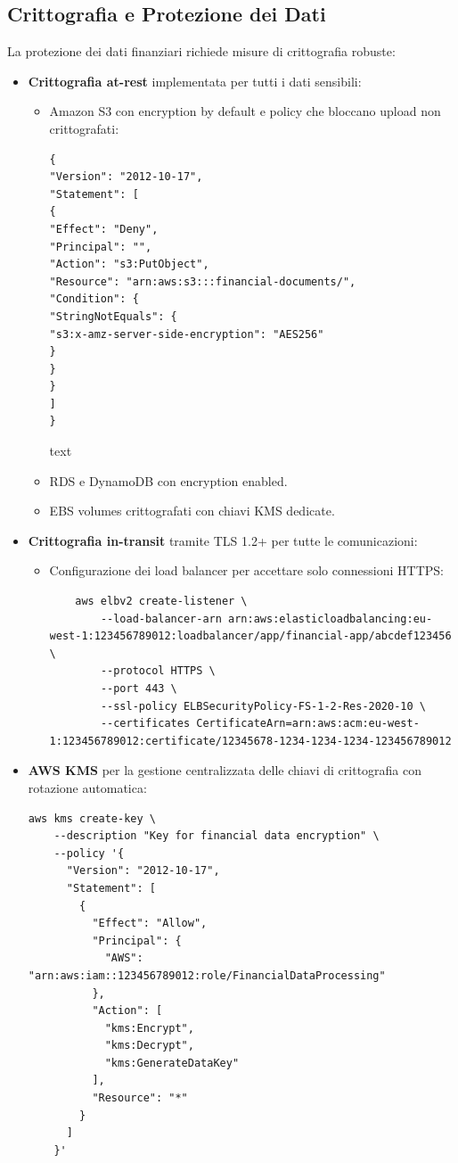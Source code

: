 \documentclass[a4paper,12pt]{report}
\begin{document}
\subsection{Crittografia e Protezione dei Dati}

La protezione dei dati finanziari richiede misure di crittografia robuste:

\begin{itemize}
\item \textbf{Crittografia at-rest} implementata per tutti i dati sensibili:
\begin{itemize}
\item Amazon S3 con encryption by default e policy che bloccano upload non crittografati:
\begin{verbatim}
{
"Version": "2012-10-17",
"Statement": [
{
"Effect": "Deny",
"Principal": "",
"Action": "s3:PutObject",
"Resource": "arn:aws:s3:::financial-documents/",
"Condition": {
"StringNotEquals": {
"s3:x-amz-server-side-encryption": "AES256"
}
}
}
]
}
\end{verbatim}

text
    \item RDS e DynamoDB con encryption enabled.
    \item EBS volumes crittografati con chiavi KMS dedicate.
\end{itemize}

\item \textbf{Crittografia in-transit} tramite TLS 1.2+ per tutte le comunicazioni:
\begin{itemize}
    \item Configurazione dei load balancer per accettare solo connessioni HTTPS:
    \begin{verbatim}
    aws elbv2 create-listener \
        --load-balancer-arn arn:aws:elasticloadbalancing:eu-west-1:123456789012:loadbalancer/app/financial-app/abcdef123456 \
        --protocol HTTPS \
        --port 443 \
        --ssl-policy ELBSecurityPolicy-FS-1-2-Res-2020-10 \
        --certificates CertificateArn=arn:aws:acm:eu-west-1:123456789012:certificate/12345678-1234-1234-1234-123456789012
    \end{verbatim}
\end{itemize}

\item \textbf{AWS KMS} per la gestione centralizzata delle chiavi di crittografia con rotazione automatica:
\begin{verbatim}
aws kms create-key \
    --description "Key for financial data encryption" \
    --policy '{
      "Version": "2012-10-17",
      "Statement": [
        {
          "Effect": "Allow",
          "Principal": {
            "AWS": "arn:aws:iam::123456789012:role/FinancialDataProcessing"
          },
          "Action": [
            "kms:Encrypt",
            "kms:Decrypt",
            "kms:GenerateDataKey"
          ],
          "Resource": "*"
        }
      ]
    }'
\end{verbatim}
\end{itemize}
\end{document}
